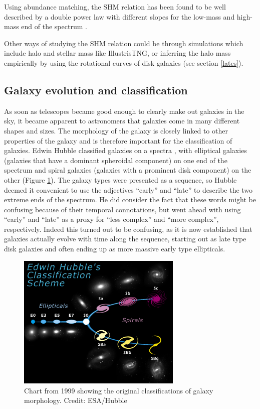 Using abundance matching, the SHM relation has been found to be well described by a double power law with different slopes for the low-mass and high-mass end of the spectrum \parencite{Behroozi2013}. 

Other ways of studying the SHM relation could be through simulations which include halo and stellar mass like IllustrisTNG, or inferring the halo mass empirically by using the rotational curves of disk galaxies (see section \ref{lates}).

\subsection{Galaxy evolution and classification}

As soon as telescopes became good enough to clearly make out galaxies in the sky, it became apparent to astronomers that galaxies come in many different shapes and sizes. The morphology of the galaxy is closely linked to other properties of the galaxy and is therefore important for the classification of galaxies. Edwin Hubble classified galaxies on a spectra \parencite{Hubble1926}, with elliptical galaxies (galaxies that have a dominant spheroidal component) on one end of the spectrum and spiral galaxies (galaxies with a prominent disk component) on the other (Figure \ref{hubble}). The galaxy types were presented as a sequence, so Hubble deemed it convenient to use the adjectives ``early'' and ``late'' to describe the two extreme ends of the spectrum. He did consider the fact that these words might be confusing because of their temporal connotations, but went ahead with using ``early'' and ``late'' as a proxy for ``less complex'' and ``more complex'', respectively. Indeed this turned out to be confusing, as it is now established that galaxies actually evolve with time along the sequence, starting out as late type disk galaxies and often ending up as more massive early type ellipticals.

\begin{figure}
    \centering
    \includegraphics[width=0.7\textwidth]{images/hubble.jpg}
    \caption{Chart from 1999 showing the original classifications of galaxy morphology. Credit: ESA/Hubble}
    \label{hubble}
\end{figure}


